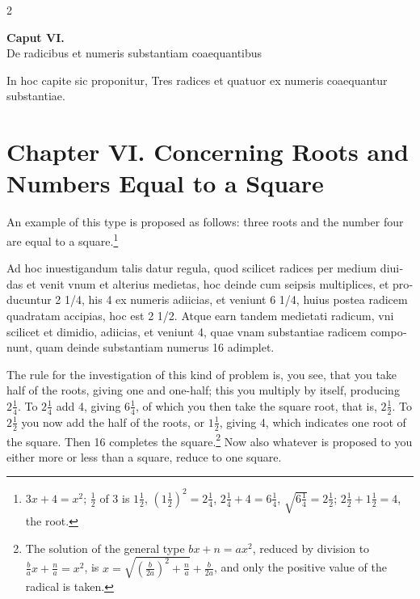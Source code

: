 \documentclass[11pt,a4paper,twoside]{book}
\newcommand{\latincolumn}[1]{\textlatin{\small #1}}
\begin{document}
\begin{paracol}{2}
\switchcolumn*

\begin{center}
{\normalsize\bfseries\color{sectioncolor} Caput VI.}\\[0.2cm]
\latincolumn{De radicibus et numeris substantiam coaequantibus}
\end{center}

\medskip

\latincolumn{In hoc capite sic proponitur, Tres radices et quatuor ex numeris coaequantur substantiae.}

\switchcolumn

\section*{Chapter VI. Concerning Roots and Numbers Equal to a Square}

An example of this type is proposed as follows: three roots and the number four are equal to a square.\footnote{$3x + 4 = x^2$; $\frac{1}{2}$ of 3 is $1\frac{1}{2}$, $(1\frac{1}{2})^2 = 2\frac{1}{4}$, $2\frac{1}{4} + 4 = 6\frac{1}{4}$, $\sqrt{6\frac{1}{4}} = 2\frac{1}{2}$; $2\frac{1}{2} + 1\frac{1}{2} = 4$, the root.}

\switchcolumn*

\latincolumn{Ad hoc inuestigandum talis datur regula, quod scilicet radices per medium diuidas et venit vnum et alterius medietas, hoc deinde cum seipsis multiplices, et producuntur 2 1/4, his 4 ex numeris adiicias, et veniunt 6 1/4, huius postea radicem quadratam accipias, hoc est 2 1/2. Atque earn tandem medietati radicum, vni scilicet et dimidio, adiicias, et veniunt 4, quae vnam substantiae radicem componunt, quam deinde substantiam numerus 16 adimplet.}

\switchcolumn

The rule for the investigation of this kind of problem is, you see, that you take half of the roots, giving one and one-half; this you multiply by itself, producing $2\frac{1}{4}$. To $2\frac{1}{4}$ add 4, giving $6\frac{1}{4}$, of which you then take the square root, that is, $2\frac{1}{2}$. To $2\frac{1}{2}$ you now add the half of the roots, or $1\frac{1}{2}$, giving 4, which indicates one root of the square. Then 16 completes the square.\footnote{The solution of the general type $bx + n = ax^2$, reduced by division to $\frac{b}{a}x + \frac{n}{a} = x^2$, is $x = \sqrt{(\frac{b}{2a})^2 + \frac{n}{a}} + \frac{b}{2a}$, and only the positive value of the radical is taken.} Now also whatever is proposed to you either more or less than a square, reduce to one square.


\end{paracol}
\end{document}
